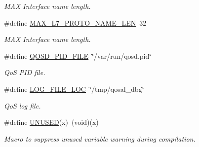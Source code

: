 \begin{DoxyCompactItemize}
\begin{DoxyCompactList}\small\item\em M\-A\-X Interface name length. \end{DoxyCompactList}\item 
\hypertarget{group__FAPI__QOS__GENERAL_ga2f3f659f8f6fbf01d76a03f42351e559}{\#define \hyperlink{group__FAPI__QOS__GENERAL_ga2f3f659f8f6fbf01d76a03f42351e559}{M\-A\-X\-\_\-\-L7\-\_\-\-P\-R\-O\-T\-O\-\_\-\-N\-A\-M\-E\-\_\-\-L\-E\-N}~32}\label{group__FAPI__QOS__GENERAL_ga2f3f659f8f6fbf01d76a03f42351e559}

\begin{DoxyCompactList}\small\item\em M\-A\-X Interface name length. \end{DoxyCompactList}\item 
\hypertarget{group__FAPI__QOS__GENERAL_ga40c47329f782fd8a018091086fdd51e2}{\#define \hyperlink{group__FAPI__QOS__GENERAL_ga40c47329f782fd8a018091086fdd51e2}{Q\-O\-S\-D\-\_\-\-P\-I\-D\-\_\-\-F\-I\-L\-E}~\char`\"{}/var/run/qosd.\-pid\char`\"{}}\label{group__FAPI__QOS__GENERAL_ga40c47329f782fd8a018091086fdd51e2}

\begin{DoxyCompactList}\small\item\em Qo\-S P\-I\-D file. \end{DoxyCompactList}\item 
\hypertarget{group__FAPI__QOS__GENERAL_ga7679e55a89721f1c43ec2215c7a23282}{\#define \hyperlink{group__FAPI__QOS__GENERAL_ga7679e55a89721f1c43ec2215c7a23282}{L\-O\-G\-\_\-\-F\-I\-L\-E\-\_\-\-L\-O\-C}~\char`\"{}/tmp/qosal\-\_\-dbg\char`\"{}}\label{group__FAPI__QOS__GENERAL_ga7679e55a89721f1c43ec2215c7a23282}

\begin{DoxyCompactList}\small\item\em Qo\-S log file. \end{DoxyCompactList}\item 
\hypertarget{group__FAPI__QOS__GENERAL_ga86d500a34c624c2cae56bc25a31b12f3}{\#define \hyperlink{group__FAPI__QOS__GENERAL_ga86d500a34c624c2cae56bc25a31b12f3}{U\-N\-U\-S\-E\-D}(x)~(void)(x)}\label{group__FAPI__QOS__GENERAL_ga86d500a34c624c2cae56bc25a31b12f3}

\begin{DoxyCompactList}\small\item\em Macro to suppress unused variable warning during compilation. \end{DoxyCompactList}\end{DoxyCompactItemize}
